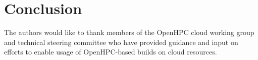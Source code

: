 \documentclass[sigconf,screen]{acmart}
\begin{document}
\section{Conclusion}
\lipsum[8]

\begin{acks}
The authors would like to thank members of the OpenHPC cloud working group and
technical steering committee who have provided guidance and input on efforts to
enable usage of OpenHPC-based builds on cloud resources.
\end{acks}

\nocite{*}



\end{document}
